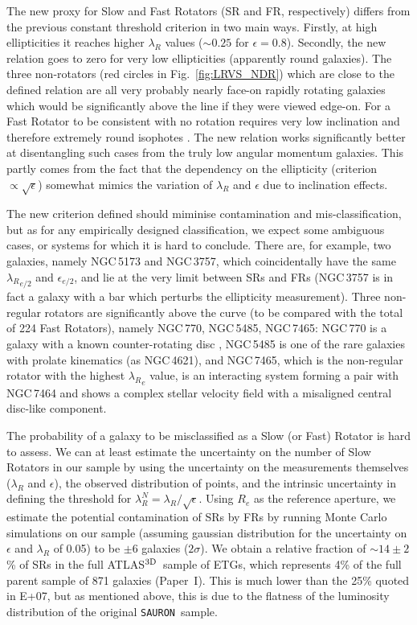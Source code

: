 \documentclass[useAMS,usenatbib,usegraphicx]{mn2e}
\newcommand{\Sauron}{\texttt{SAURON}}
\newcommand{\atlas}{{ATLAS$^{\rm 3D}$}}
\begin{document}
The new proxy for Slow and Fast Rotators (SR and FR, respectively) 
differs from the previous constant threshold criterion in two main ways. Firstly, at high ellipticities it
reaches higher $\lambda_R$ values ($\sim 0.25$ for $\epsilon = 0.8$). Secondly, the new relation goes to zero
for very low ellipticities (apparently round galaxies). 
The three non-rotators (red circles in Fig.~\ref{fig:LRVS_NDR})
which are close to the defined relation are all very probably nearly face-on rapidly rotating
galaxies which would be significantly above the line if they were viewed edge-on.
For a Fast Rotator to be consistent with no rotation requires very low inclination and therefore
extremely round isophotes \citep[see e.g.][]{Jesseit+09}. 
The new relation works significantly
better at disentangling such cases from the truly low angular momentum galaxies.
This partly comes from the fact that the dependency on the ellipticity
(criterion $\propto \sqrt{\epsilon}$) somewhat mimics the variation of
$\lambda_R$ and $\epsilon$ due to inclination effects. 

The new criterion defined should miminise contamination and mis-classification,
but as for any empirically designed classification, we expect 
some ambiguous cases, or systems for which it is hard to conclude.
There are, for example, two galaxies, namely NGC\,5173 and NGC\,3757, which coincidentally have 
the same ${\lambda_R}_{e/2}$ and ${\epsilon}_{e/2}$, 
and lie at the very limit between SRs and FRs (NGC\,3757 is in fact a galaxy with a bar which perturbs the
ellipticity measurement). Three non-regular rotators are significantly above the curve (to
be compared with the total of 224 Fast Rotators), namely NGC\,770, NGC\,5485, NGC\,7465: NGC\,770 is a
galaxy with a known counter-rotating disc \citep{Geha+05}, NGC\,5485 is one of
the rare galaxies with prolate kinematics (as NGC\,4621), and NGC\,7465, which is the non-regular rotator with
the highest ${\lambda_R}_e$ value, is an interacting system forming a pair with NGC\,7464 \citep{LiSeaquist94} and
shows a complex stellar velocity field with a misaligned central disc-like component.

The probability of a galaxy to be misclassified as a Slow (or Fast) Rotator is 
hard to assess. We can at least estimate the uncertainty on the number of Slow
Rotators in our sample by using the uncertainty on the measurements 
themselves ($\lambda_R$ and $\epsilon$), the observed distribution of
points, and the intrinsic uncertainty in defining the threshold for
${\lambda_R^N} = {\lambda_R} / \sqrt{\epsilon}$. 
Using $R_e$ as the reference aperture, we estimate the
potential contamination of SRs by FRs by running Monte Carlo
simulations on our sample (assuming gaussian distribution for the uncertainty on 
$\epsilon$ and $\lambda_R$ of 0.05) to be $\pm 6$ galaxies ($2 \sigma$). 
We obtain a relative fraction of $\sim 14 \pm 2$\% of SRs in the full
\atlas\ sample of ETGs, which represents 4\% of the full parent sample of 871
galaxies (Paper~I). This is much lower than the 25\% quoted in E+07,
but as mentioned above, this is due to the flatness of the luminosity
distribution of the original \Sauron\ sample.
\end{document}
